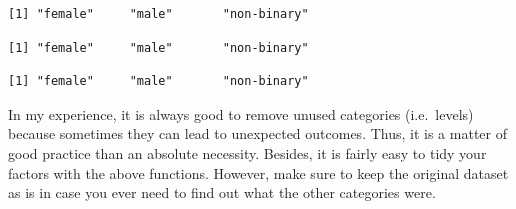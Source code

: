 \documentclass[
  letterpaper,
  DIV=11,
  numbers=noendperiod]{scrreprt}
\newenvironment{Shaded}{\begin{snugshade}}{\end{snugshade}}
\newcommand{\AttributeTok}[1]{\textcolor[rgb]{0.40,0.45,0.13}{#1}}
\newcommand{\CommentTok}[1]{\textcolor[rgb]{0.37,0.37,0.37}{#1}}
\newcommand{\FunctionTok}[1]{\textcolor[rgb]{0.28,0.35,0.67}{#1}}
\newcommand{\NormalTok}[1]{\textcolor[rgb]{0.00,0.23,0.31}{#1}}
\newcommand{\OtherTok}[1]{\textcolor[rgb]{0.00,0.23,0.31}{#1}}
\newcommand{\SpecialCharTok}[1]{\textcolor[rgb]{0.37,0.37,0.37}{#1}}
\begin{document}
\begin{Shaded}
\end{Shaded}

\begin{verbatim}
[1] "female"     "male"       "non-binary"
\end{verbatim}

\begin{Shaded}
\end{Shaded}

\begin{verbatim}
[1] "female"     "male"       "non-binary"
\end{verbatim}

\begin{Shaded}
\end{Shaded}

\begin{verbatim}
[1] "female"     "male"       "non-binary"
\end{verbatim}

In my experience, it is always good to remove unused categories
(i.e.~levels) because sometimes they can lead to unexpected outcomes.
Thus, it is a matter of good practice than an absolute necessity.
Besides, it is fairly easy to tidy your factors with the above
functions. However, make sure to keep the original dataset as is in case
you ever need to find out what the other categories were.
\end{document}
